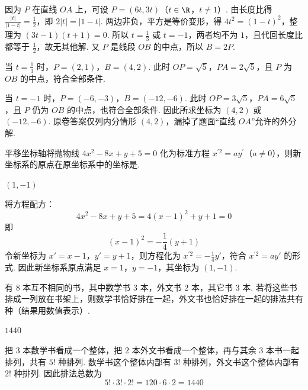 \begin{solution}
因为 \(P\) 在直线 \(OA\) 上，可设 \(P=(6t,3t)\)（\(t\in\R\)，\(t\neq1\)）. 由长度比得 \(\frac{|t|}{|1-t|}=\frac12\)，即 \(2|t|=|1-t|\). 两边非负，平方是等价变形，得 \(4t^2=(1-t)^2\)，整理为 \((3t-1)(t+1)=0\). 所以 \(t=\frac13\) 或 \(t=-1\)，两者均不为 \(1\)，且代回长度比都等于 \(\frac12\)，故无其他解. 又 \(P\) 是线段 \(OB\) 的中点，所以 \(B=2P\).

当 \(t=\frac13\) 时，\(P=(2,1)\)，\(B=(4,2)\). 此时 \(OP=\sqrt5\)，\(PA=2\sqrt5\)，且 \(P\) 为 \(OB\) 的中点，符合全部条件.

当 \(t=-1\) 时，\(P=(-6,-3)\)，\(B=(-12,-6)\). 此时 \(OP=3\sqrt5\)，\(PA=6\sqrt5\)，且 \(P\) 仍为 \(OB\) 的中点，也符合全部条件. 因此所求坐标为 \((4,2)\) 或 \((-12,-6)\). 原卷答案仅列内分情形 \((4,2)\)，漏掉了题面“直线 \(OA\)”允许的外分解.
\end{solution}

\begin{problem}[A]
平移坐标轴将抛物线 \(4x^2-8x+y+5=0\) 化为标准方程 \(x^{\prime2}=ay^\prime\)（\(a\neq0\)），则新坐标系的原点在原坐标系中的坐标是\fillinblank{}.
\end{problem}

\begin{answer}
\((1,-1)\)
\end{answer}

\begin{solution}
将方程配方：
\[
4x^2-8x+y+5=4(x-1)^2+y+1=0
\]
即
\[
(x-1)^2=-\frac{1}{4}(y+1)
\]
令新坐标为 \(x'=x-1\)，\(y'=y+1\)，则方程化为
\(x^{\prime2}=-\frac{1}{4}y'\)，符合 \(x^{\prime2}=ay'\) 的形式. 因此新坐标系原点满足
\(x=1\)，\(y=-1\)，其坐标为 \((1,-1)\).
\end{solution}

\begin{problem}[A]
有 \(8\) 本互不相同的书，其中数学书 \(3\) 本，外文书 \(2\) 本，其它书 \(3\) 本. 若将这些书排成一列放在书架上，则数学书恰好排在一起，外文书也恰好排在一起的排法共有\fillinblank{}种（结果用数值表示）.
\end{problem}

\begin{answer}
\(1440\)
\end{answer}

\begin{solution}
把 \(3\) 本数学书看成一个整体，把 \(2\) 本外文书看成一个整体，再与其余 \(3\) 本书一起排列，共有 \(5!\) 种排列. 数学书这个整体内部有 \(3!\) 种排列，外文书这个整体内部有 \(2!\) 种排列. 因此排法总数为
\[
5!\cdot3!\cdot2!=120\cdot6\cdot2=1440
\]
\end{solution}

